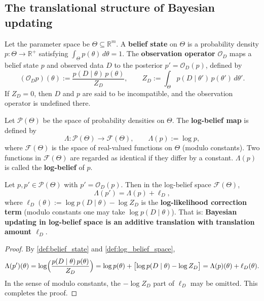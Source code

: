 \subsection{The translational structure of Bayesian updating}\label{subsec:bayesian_translation}

\begin{definition}\label{def:belief_state}
Let the parameter space be $\Theta\subseteq\mathbb{R}^m$. A \textbf{belief state} on $\Theta$ is a probability density $p:\Theta\to\mathbb{R}^+$ satisfying $\int_\Theta p(\theta)\,d\theta = 1$. The \textbf{observation operator} $\mathcal{O}_D$ maps a belief state $p$ and observed data $D$ to the posterior $p' = \mathcal{O}_D(p)$, defined by
\[
(\mathcal{O}_D p)(\theta) := \frac{p(D\mid\theta)\,p(\theta)}{Z_D}, \qquad Z_D := \int_\Theta p(D\mid\theta')\,p(\theta')\,d\theta'.
\]
If $Z_D = 0$, then $D$ and $p$ are said to be incompatible, and the observation operator is undefined there.
\end{definition}

\begin{definition}\label{def:log_belief_space}
Let $\mathcal{P}(\Theta)$ be the space of probability densities on $\Theta$. The \textbf{log-belief map} is defined by
\[
\Lambda:\mathcal{P}(\Theta)\to \mathcal{F}(\Theta), \qquad \Lambda(p) := \log p,
\]
where $\mathcal{F}(\Theta)$ is the space of real-valued functions on $\Theta$ (modulo constants). Two functions in $\mathcal{F}(\Theta)$ are regarded as identical if they differ by a constant. $\Lambda(p)$ is called the \textbf{log-belief} of $p$.
\end{definition}

\begin{theorem}\label{thm:bayesian_translation_structure}
Let $p,p'\in\mathcal{P}(\Theta)$ with $p' = \mathcal{O}_D(p)$. Then in the log-belief space $\mathcal{F}(\Theta)$,
\[
\boxed{\ \Lambda(p') = \Lambda(p) + \ell_D,\ }
\]
where $\ell_D(\theta) := \log p(D\mid\theta) - \log Z_D$ is the \textbf{log-likelihood correction term} (modulo constants one may take $\log p(D\mid\theta)$). That is: \textbf{Bayesian updating in log-belief space is an additive translation with translation amount $\ell_D$}.
\end{theorem}

\begin{proof}
By \cref{def:belief_state} and \cref{def:log_belief_space},
\[
\Lambda(p')(\theta) = \log\Bigl(\frac{p(D\mid\theta)\,p(\theta)}{Z_D}\Bigr) = \log p(\theta) + \bigl[\log p(D\mid\theta) - \log Z_D\bigr] = \Lambda(p)(\theta) + \ell_D(\theta).
\]
In the sense of modulo constants, the $-\log Z_D$ part of $\ell_D$ may be omitted. This completes the proof.
\end{proof}

